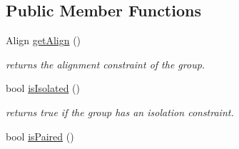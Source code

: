 \subsection*{Public Member Functions}
\begin{DoxyCompactItemize}
\item 
\hypertarget{class_open_chams_1_1_group_a7cff0c4a6957f23fb1ea4598f4b8a0b8}{Align \hyperlink{class_open_chams_1_1_group_a7cff0c4a6957f23fb1ea4598f4b8a0b8}{get\-Align} ()}\label{class_open_chams_1_1_group_a7cff0c4a6957f23fb1ea4598f4b8a0b8}

\begin{DoxyCompactList}\small\item\em returns the alignment constraint of the group. \end{DoxyCompactList}\item 
\hypertarget{class_open_chams_1_1_group_ab5ae4a4550c418c974ff6e59967eeec2}{bool \hyperlink{class_open_chams_1_1_group_ab5ae4a4550c418c974ff6e59967eeec2}{is\-Isolated} ()}\label{class_open_chams_1_1_group_ab5ae4a4550c418c974ff6e59967eeec2}

\begin{DoxyCompactList}\small\item\em returns true if the group has an isolation constraint. \end{DoxyCompactList}\item 
\hypertarget{class_open_chams_1_1_group_aee0abf07a6e9d41f511c648e6eaecea3}{bool \hyperlink{class_open_chams_1_1_group_aee0abf07a6e9d41f511c648e6eaecea3}{is\-Paired} ()}\label{class_open_chams_1_1_group_aee0abf07a6e9d41f511c648e6eaecea3}


\end{DoxyCompactItemize}
